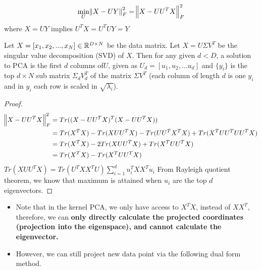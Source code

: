 \begin{refsection}
\begin{definition}
$$\min_{U} \norm{X-UY}^2_F = \norm{X - UU^TX}^2_F$$
where $X = UY $ implies $U^TX = U^TUY= Y$
\end{definition}



\begin{theorem}
\cite[21]{ma2002generalized}Let $X = [x_1,x_2,...,x_N] \in \mathbb{R}^{D\times N}$ be the data matrix. Let $X = U\Sigma V^T$ be the singular value decomposition (SVD) of $X$. Then for any given $d < D$, a solution to PCA is the first $d$ columns of$U$, given as $U_d = [u_1,u_2,...u_d]$ and $\{y_i\}$ is the top $d\times N$ sub matrix $\Sigma_d V_d^T$ of the matrix $\Sigma V^T$ (each column of length $d$ is one $y_i$ and in $y_i$ each row is scaled in $\sqrt{\lambda_i}$). 
\end{theorem}
\begin{proof}
\begin{align*}
    \norm{X - UU^TX}^2_F &= Tr((X - UU^TX)^T(X - UU^TX))\\
            &=Tr(X^TX) - Tr(XUU^TX) - Tr(UU^TX^TX) + Tr(X^TUU^TUU^TX)\\
            &=Tr(X^TX) - 2Tr(XUU^TX) + Tr(X^TUU^TX)\\
            &=Tr(X^TX) - Tr(X^TUU^TX)\\
\end{align*}
$Tr(XUU^TX) = Tr(U^TXX^TU)\sum_{i=1}^d u_i^T XX^T u_i$
From Rayleigh quotient theorem, we know that maximum is attained when $u_i$ are the top $d$ eigenvectors. 

\end{proof}



\begin{remark}\cite[142]{shawe2004kernel}\hfill
\begin{itemize}
    \item Note that in the kernel PCA, we only have access to $X^TX$, instead of $XX^T$, therefore, we can \textbf{only directly calculate the projected coordinates (projection into the eigenspace), and cannot calculate the eigenvector.}
    \item However, we can still project new data point via the following dual form method. 
\end{itemize}
\end{remark}







\end{refsection}

